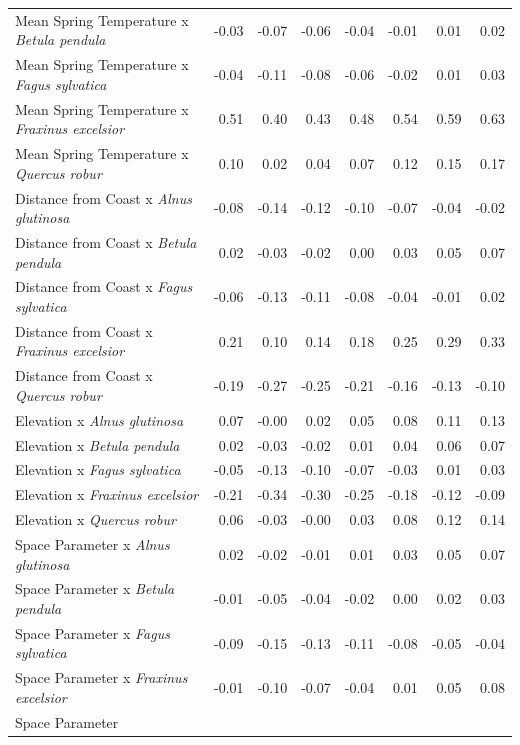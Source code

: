 \documentclass{article}\usepackage[]{graphicx}\usepackage[]{color}
\begin{document}
\begin{longtable}{lrrrrrrr}
  Mean Spring 
Temperature
x\textit{ Betula pendula} & -0.03 & -0.07 & -0.06 & -0.04 & -0.01 & 0.01 & 0.02 \\ 
  Mean Spring 
Temperature
x\textit{ Fagus sylvatica} & -0.04 & -0.11 & -0.08 & -0.06 & -0.02 & 0.01 & 0.03 \\ 
  Mean Spring 
Temperature
x\textit{ Fraxinus excelsior} & 0.51 & 0.40 & 0.43 & 0.48 & 0.54 & 0.59 & 0.63 \\ 
  Mean Spring 
Temperature
x\textit{ Quercus robur} & 0.10 & 0.02 & 0.04 & 0.07 & 0.12 & 0.15 & 0.17 \\ 
  Distance from 
Coast
x\textit{ Alnus glutinosa} & -0.08 & -0.14 & -0.12 & -0.10 & -0.07 & -0.04 & -0.02 \\ 
  Distance from 
Coast
x\textit{ Betula pendula} & 0.02 & -0.03 & -0.02 & 0.00 & 0.03 & 0.05 & 0.07 \\ 
  Distance from 
Coast
x\textit{ Fagus sylvatica} & -0.06 & -0.13 & -0.11 & -0.08 & -0.04 & -0.01 & 0.02 \\ 
  Distance from 
Coast
x\textit{ Fraxinus excelsior} & 0.21 & 0.10 & 0.14 & 0.18 & 0.25 & 0.29 & 0.33 \\ 
  Distance from 
Coast
x\textit{ Quercus robur} & -0.19 & -0.27 & -0.25 & -0.21 & -0.16 & -0.13 & -0.10 \\ 
  Elevation
x\textit{ Alnus glutinosa} & 0.07 & -0.00 & 0.02 & 0.05 & 0.08 & 0.11 & 0.13 \\ 
  Elevation
x\textit{ Betula pendula} & 0.02 & -0.03 & -0.02 & 0.01 & 0.04 & 0.06 & 0.07 \\ 
  Elevation
x\textit{ Fagus sylvatica} & -0.05 & -0.13 & -0.10 & -0.07 & -0.03 & 0.01 & 0.03 \\ 
  Elevation
x\textit{ Fraxinus excelsior} & -0.21 & -0.34 & -0.30 & -0.25 & -0.18 & -0.12 & -0.09 \\ 
  Elevation
x\textit{ Quercus robur} & 0.06 & -0.03 & -0.00 & 0.03 & 0.08 & 0.12 & 0.14 \\ 
  Space Parameter
x\textit{ Alnus glutinosa} & 0.02 & -0.02 & -0.01 & 0.01 & 0.03 & 0.05 & 0.07 \\ 
  Space Parameter
x\textit{ Betula pendula} & -0.01 & -0.05 & -0.04 & -0.02 & 0.00 & 0.02 & 0.03 \\ 
  Space Parameter
x\textit{ Fagus sylvatica} & -0.09 & -0.15 & -0.13 & -0.11 & -0.08 & -0.05 & -0.04 \\ 
  Space Parameter
x\textit{ Fraxinus excelsior} & -0.01 & -0.10 & -0.07 & -0.04 & 0.01 & 0.05 & 0.08 \\ 
  Space Parameter

\end{longtable}
\end{document}

